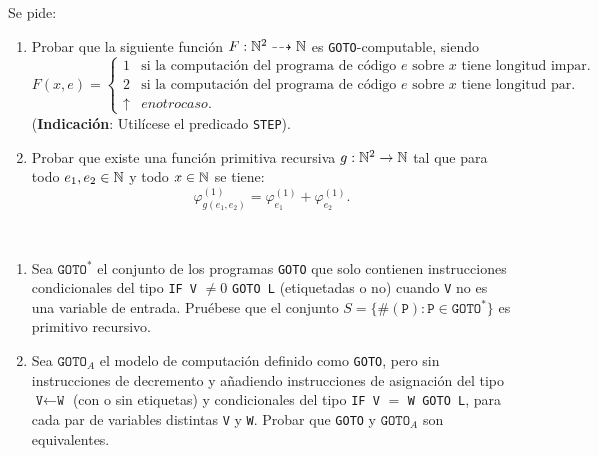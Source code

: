 \documentclass[twoside]{article}
\begin{document}
\begin{ejercicio}{2}
Se pide:
\begin{enumerate}
\item Probar que la siguiente función $F : \mathbb{N}^2\dashrightarrow \mathbb{N}$ es \texttt{GOTO}-computable, siendo
\[
F(x,e)=\begin{cases}
1 & \text{si la computación del programa de código }e\text{ sobre }x\text{ tiene longitud impar}.\\
2 & \text{si la computación del programa de código }e\text{ sobre }x\text{ tiene longitud par}.\\
\uparrow & en otro caso.
\end{cases}
\]
(\textbf{Indicación}: Utilícese el predicado \texttt{STEP}).
\item Probar que existe una función primitiva recursiva $g : \mathbb{N}^2 \to \mathbb{N}$ tal que para todo
$e_1, e_2 \in \mathbb{N}$ y todo $x \in \mathbb{N}$ se tiene:
$$\varphi_{g(e_1,e_2)}^{(1)}=\varphi_{e_1}^{(1)}+\varphi_{e_2}^{(1)}.$$
\end{enumerate}
\end{ejercicio}
\begin{solucion}
\end{solucion}

\newpage

\begin{ejercicio}{3}
\end{ejercicio}\
\begin{enumerate}
\item Sea $\texttt{GOTO}^*$ el conjunto de los programas \texttt{GOTO} que solo contienen instrucciones condicionales
del tipo \texttt{IF V} $\neq 0$ \texttt{GOTO L} (etiquetadas o no) cuando \texttt{V} no es una variable de
entrada. Pruébese que el conjunto $S = \{\#(\texttt{P}) : \texttt{P} \in \texttt{GOTO}^*\}$ es primitivo recursivo.

\item Sea $\texttt{GOTO}_A$ el modelo de computación definido como \texttt{GOTO}, pero sin instrucciones de
decremento y añadiendo instrucciones de asignación del tipo $\texttt{V}\leftarrow \texttt{W}$ (con o sin etiquetas)
y condicionales del tipo \texttt{IF V} $=$ \texttt{W GOTO L}, para cada par de variables distintas \texttt{V} y \texttt{W}.
Probar que \texttt{GOTO} y $\texttt{GOTO}_A$ son equivalentes.
\end{enumerate}
\begin{solucion}
\end{solucion}

\newpage
\end{document}
